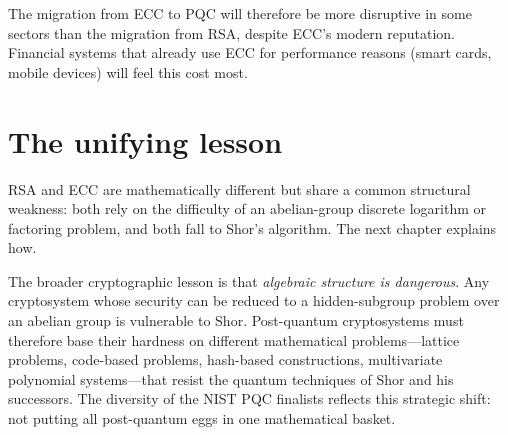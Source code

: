 The migration from ECC to PQC will therefore be more disruptive in some sectors than the migration from RSA, despite ECC's modern reputation. Financial systems that already use ECC for performance reasons (smart cards, mobile devices) will feel this cost most.

\section{The unifying lesson}

RSA and ECC are mathematically different but share a common structural weakness: both rely on the difficulty of an abelian-group discrete logarithm or factoring problem, and both fall to Shor's algorithm. The next chapter explains how.

The broader cryptographic lesson is that \emph{algebraic structure is dangerous}. Any cryptosystem whose security can be reduced to a hidden-subgroup problem over an abelian group is vulnerable to Shor. Post-quantum cryptosystems must therefore base their hardness on different mathematical problems---lattice problems, code-based problems, hash-based constructions, multivariate polynomial systems---that resist the quantum techniques of Shor and his successors. The diversity of the NIST PQC finalists reflects this strategic shift: not putting all post-quantum eggs in one mathematical basket.

\textsep
